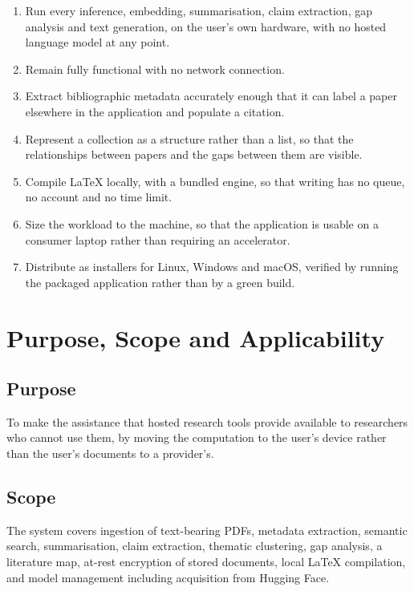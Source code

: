 \documentclass[12pt,a4paper]{report}
\begin{document}
\begin{enumerate}[leftmargin=*]
  \item Run every inference, embedding, summarisation, claim extraction, gap
        analysis and text generation, on the user's own hardware, with no
        hosted language model at any point.
  \item Remain fully functional with no network connection.
  \item Extract bibliographic metadata accurately enough that it can label a
        paper elsewhere in the application and populate a citation.
  \item Represent a collection as a structure rather than a list, so that the
        relationships between papers and the gaps between them are visible.
  \item Compile \LaTeX{} locally, with a bundled engine, so that writing has no
        queue, no account and no time limit.
  \item Size the workload to the machine, so that the application is usable on
        a consumer laptop rather than requiring an accelerator.
  \item Distribute as installers for Linux, Windows and macOS, verified by
        running the packaged application rather than by a green build.
\end{enumerate}

\section{Purpose, Scope and Applicability}

\subsection{Purpose}

To make the assistance that hosted research tools provide available to
researchers who cannot use them, by moving the computation to the user's device
rather than the user's documents to a provider's.

\subsection{Scope}

The system covers ingestion of text-bearing PDFs, metadata extraction, semantic
search, summarisation, claim extraction, thematic clustering, gap analysis, a
literature map, at-rest encryption of stored documents, local \LaTeX{}
compilation, and model management including acquisition from Hugging Face.
\end{document}
